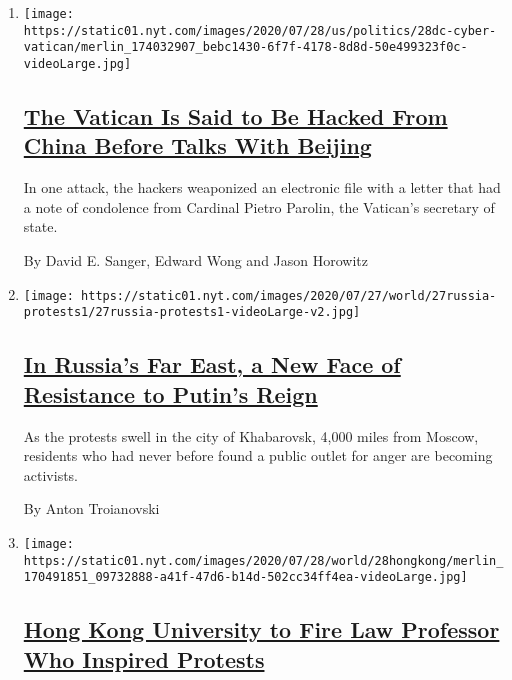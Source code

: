 \begin{enumerate}
\def\labelenumi{\arabic{enumi}.}
\item
  \texttt{[image: https://static01.nyt.com/images/2020/07/28/us/politics/28dc-cyber-vatican/merlin\_174032907\_bebc1430-6f7f-4178-8d8d-50e499323f0c-videoLarge.jpg]}

  \hypertarget{the-vatican-is-said-to-be-hacked-from-china-before-talks-with-beijing}{%
  \subsection{\texorpdfstring{\href{/2020/07/28/us/politics/china-vatican-hack.html}{The
  Vatican Is Said to Be Hacked From China Before Talks With
  Beijing}}{The Vatican Is Said to Be Hacked From China Before Talks With Beijing}}\label{the-vatican-is-said-to-be-hacked-from-china-before-talks-with-beijing}}

  In one attack, the hackers weaponized an electronic file with a letter
  that had a note of condolence from Cardinal Pietro Parolin, the
  Vatican's secretary of state.

  By David E. Sanger, Edward Wong and Jason Horowitz
\item
  \texttt{[image: https://static01.nyt.com/images/2020/07/27/world/27russia-protests1/27russia-protests1-videoLarge-v2.jpg]}

  \hypertarget{in-russias-far-east-a-new-face-of-resistance-to-putins-reign}{%
  \subsection{\texorpdfstring{\href{/2020/07/28/world/europe/russias-far-east-protests-putin.html}{In
  Russia's Far East, a New Face of Resistance to Putin's
  Reign}}{In Russia's Far East, a New Face of Resistance to Putin's Reign}}\label{in-russias-far-east-a-new-face-of-resistance-to-putins-reign}}

  As the protests swell in the city of Khabarovsk, 4,000 miles from
  Moscow, residents who had never before found a public outlet for anger
  are becoming activists.

  By Anton Troianovski
\item
  \texttt{[image: https://static01.nyt.com/images/2020/07/28/world/28hongkong/merlin\_170491851\_09732888-a41f-47d6-b14d-502cc34ff4ea-videoLarge.jpg]}

  \hypertarget{hong-kong-university-to-fire-law-professor-who-inspired-protests}{%
  \subsection{\texorpdfstring{\href{/2020/07/28/world/asia/benny-tai-hong-kong-university.html}{Hong
  Kong University to Fire Law Professor Who Inspired
  Protests}}{Hong Kong University to Fire Law Professor Who Inspired Protests}}\label{hong-kong-university-to-fire-law-professor-who-inspired-protests}}


\end{enumerate}
